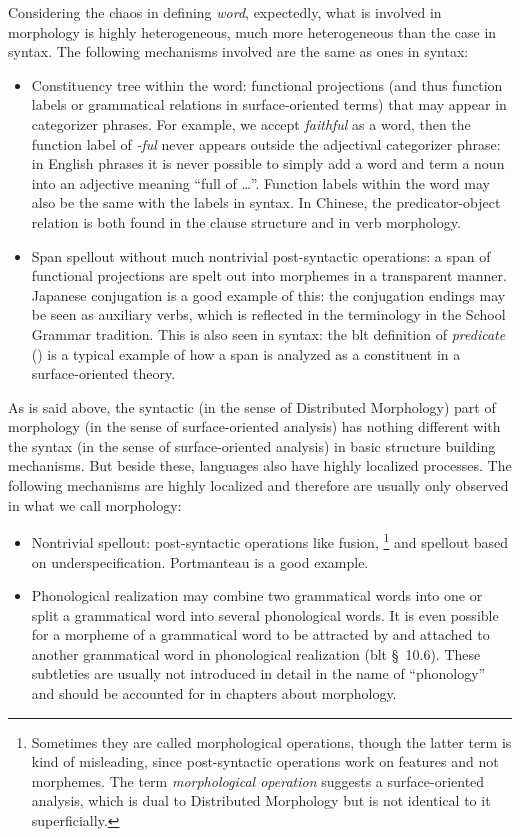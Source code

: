 \documentclass[UTF8, a4paper, oneside, scheme=plain]{ctexart}
\newcommand*{\citesec}[1]{\S~{#1}}
\newcommand*{\term}[1]{\emph{#1}}
\begin{document}
Considering the chaos in defining \term{word},
expectedly, what is involved in morphology is highly heterogeneous,
much more heterogeneous than the case in syntax.
The following mechanisms involved are the same as ones in syntax:
\begin{itemize}
    \item Constituency tree within the word: 
    functional projections (and thus function labels or grammatical relations in surface-oriented terms) 
    that may appear in categorizer phrases.
    For example, we accept \term{faithful} as a word,
    then the function label of \term{-ful} never appears outside the adjectival categorizer phrase:
    in English phrases it is never possible to simply add a word 
    and term a noun into an adjective meaning ``full of \dots''.
    Function labels within the word may also be the same with 
    the labels in syntax.
    In Chinese, the predicator-object relation is both found in the clause structure and in verb morphology. %
    \item Span spellout without much nontrivial post-syntactic operations: 
    a span of functional projections are spelt out into morphemes
    in a transparent manner.
    Japanese conjugation is a good example of this:
    the conjugation endings may be seen as auxiliary verbs,
    which is reflected in the terminology in the School Grammar tradition.
    This is also seen in syntax:
    the \ac{blt} definition of \term{predicate} () is a typical example 
    of how a span is analyzed as a constituent 
    in a surface-oriented theory.
\end{itemize}
As is said above, 
the syntactic (in the sense of Distributed Morphology) part 
of morphology (in the sense of surface-oriented analysis)
has nothing different with the syntax (in the sense of surface-oriented analysis)
in basic structure building mechanisms.
But beside these, languages also have highly localized processes.
The following mechanisms are highly localized and therefore are usually only observed 
in what we call morphology:
\begin{itemize}
    \item Nontrivial spellout: post-syntactic operations like fusion,%
    \footnote{
        Sometimes they are called morphological operations,
        though the latter term is kind of misleading,
        since post-syntactic operations work on features and not morphemes.
        The term \term{morphological operation} suggests 
        a surface-oriented analysis,
        which is dual to Distributed Morphology
        but is not identical to it superficially.
    }
    and spellout based on underspecification.
    Portmanteau is a good example.
    \item Phonological realization may combine two grammatical words into one 
    or split a grammatical word into several phonological words.
    It is even possible for a morpheme of a grammatical word to be 
    attracted by and attached to another grammatical word
    in phonological realization (\ac{blt} \citesec{10.6}). 
    These subtleties are usually not introduced in detail in the name of ``phonology''
    and should be accounted for in chapters about morphology.
\end{itemize}
\end{document}
